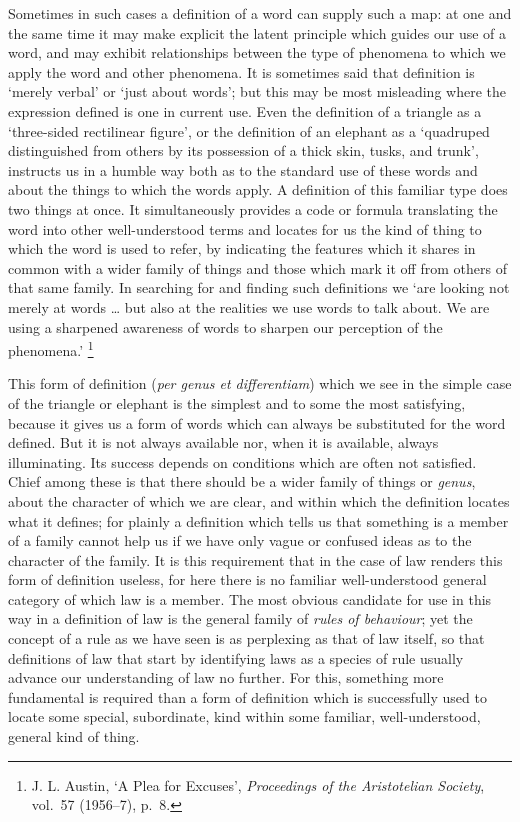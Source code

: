 \documentclass[12pt,oneside]{book}  %
\begin{document}
Sometimes in such cases a definition of a word can supply such a map: at
one and the same time it may make explicit the latent principle which
guides our use of a word, and may exhibit relationships between the type
of phenomena to which we apply the word and other phenomena. It is
sometimes said that definition is `merely verbal' or `just about words';
but this may be most misleading where the expression defined is one in
current use. Even the definition of a triangle as a `three-sided
rectilinear figure', or the definition of an elephant as a `quadruped
distinguished from others by its possession of a thick skin, tusks, and
trunk', instructs us in a humble way both as to the standard use of
these words and about the things to which the words apply. A definition
of this familiar type does two things at once. It simultaneously
provides a code or formula translating the word into other
well-understood terms and locates for us the kind of thing to which the
word is used to refer, by indicating the features which it shares in
common with a wider family of things and those which mark it off from
others of that same family. In searching for and finding such
definitions we `are looking not merely at words \ldots{} but also at the
realities we use words to talk about. We are using a sharpened awareness
of words to sharpen our perception of the phenomena.' \footnote{J. L.
  Austin, `A Plea for Excuses', \emph{Proceedings of the Aristotelian
  Society}, vol.~57 (1956--7), p.~8.}

This form of definition (\emph{per genus et differentiam}) which we see
in the simple case of the triangle or elephant is the simplest and to
some the most satisfying, because it gives us a form of words which can
always be substituted for the word defined. But it is not always
available nor, when it is available, always illuminating. Its success
depends on conditions which are often not satisfied. Chief among these
is that there should be a wider family of things or \emph{genus}, about
the character of which we are clear, and within which the definition
locates what it defines; for plainly a definition which tells us that
something is a member of a family cannot help us if we have only vague
or confused ideas as to the character of the family. It is this
requirement that in the case of law renders this form of definition
useless, for here there is no familiar well-understood general category
of which law is a member. The most obvious candidate for use in this way
in a definition of law is the general family of \emph{rules of
behaviour}; yet the concept of a rule as we have seen is as perplexing
as that of law itself, so that definitions of law that start by
identifying laws as a species of rule usually advance our understanding
of law no further. For this, something more fundamental is required than
a form of definition which is successfully used to locate some special,
subordinate, kind within some familiar, well-understood, general kind of
thing.
\end{document}
